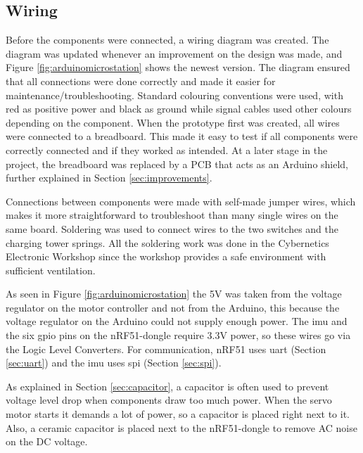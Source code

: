 \subsection{Wiring}
Before the components were connected, a wiring diagram was created. The diagram was updated whenever an improvement on the design was made, and Figure \ref{fig:arduinomicrostation} shows the newest version. The diagram ensured that all connections were done correctly and made it easier for maintenance/troubleshooting. Standard colouring conventions were used, with red as positive power and black as ground while signal cables used other colours depending on the component. When the prototype first was created, all wires were connected to a breadboard. This made it easy to test if all components were correctly connected and if they worked as intended. At a later stage in the project, the breadboard was replaced by a PCB that acts as an Arduino shield, further explained in Section \ref{sec:improvements}.

Connections between components were made with self-made jumper wires, which makes it more straightforward to troubleshoot than many single wires on the same board. Soldering was used to connect wires to the two switches and the charging tower springs. All the soldering work was done in the Cybernetics Electronic Workshop since the workshop provides a safe environment with sufficient ventilation.

As seen in Figure \ref{fig:arduinomicrostation} the 5V was taken from the voltage regulator on the motor controller and not from the Arduino, this because the voltage regulator on the Arduino could not supply enough power. The \acrshort{imu} and the six \acrshort{gpio} pins on the nRF51-dongle require 3.3V power, so these wires go via the Logic Level Converters. For communication, nRF51 uses \acrshort{uart} (Section \ref{sec:uart}) and the \acrshort{imu} uses \acrshort{spi} (Section \ref{sec:spi}).

As explained in Section \ref{sec:capacitor}, a capacitor is often used to prevent voltage level drop when components draw too much power. When the servo motor starts it demands a lot of power, so a capacitor is placed right next to it. Also, a ceramic capacitor is placed next to the nRF51-dongle to remove AC noise on the DC voltage. 